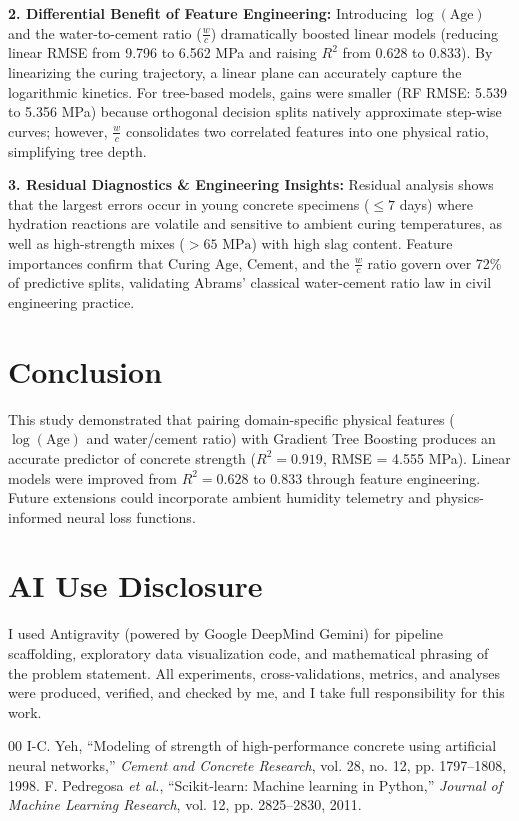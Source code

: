 \documentclass[conference]{IEEEtran}
\begin{document}
\textbf{2. Differential Benefit of Feature Engineering:} Introducing $\log(\text{Age})$ and the water-to-cement ratio ($\frac{w}{c}$) dramatically boosted linear models (reducing linear RMSE from 9.796 to 6.562 MPa and raising $R^2$ from 0.628 to 0.833). By linearizing the curing trajectory, a linear plane can accurately capture the logarithmic kinetics. For tree-based models, gains were smaller (RF RMSE: 5.539 to 5.356 MPa) because orthogonal decision splits natively approximate step-wise curves; however, $\frac{w}{c}$ consolidates two correlated features into one physical ratio, simplifying tree depth.

\textbf{3. Residual Diagnostics \& Engineering Insights:} Residual analysis shows that the largest errors occur in young concrete specimens ($\le 7$ days) where hydration reactions are volatile and sensitive to ambient curing temperatures, as well as high-strength mixes ($>65\text{ MPa}$) with high slag content. Feature importances confirm that Curing Age, Cement, and the $\frac{w}{c}$ ratio govern over 72\% of predictive splits, validating Abrams' classical water-cement ratio law in civil engineering practice.

\section{Conclusion}
This study demonstrated that pairing domain-specific physical features ($\log(\text{Age})$ and water/cement ratio) with Gradient Tree Boosting produces an accurate predictor of concrete strength ($R^2 = 0.919$, RMSE = 4.555 MPa). Linear models were improved from $R^2 = 0.628$ to $0.833$ through feature engineering. Future extensions could incorporate ambient humidity telemetry and physics-informed neural loss functions.

\section*{AI Use Disclosure}
I used Antigravity (powered by Google DeepMind Gemini) for pipeline scaffolding, exploratory data visualization code, and mathematical phrasing of the problem statement. All experiments, cross-validations, metrics, and analyses were produced, verified, and checked by me, and I take full responsibility for this work.

\begin{thebibliography}{00}
 I-C. Yeh, ``Modeling of strength of high-performance concrete using artificial neural networks,'' \emph{Cement and Concrete Research}, vol. 28, no. 12, pp. 1797--1808, 1998.
 F. Pedregosa \emph{et al.}, ``Scikit-learn: Machine learning in Python,'' \emph{Journal of Machine Learning Research}, vol. 12, pp. 2825--2830, 2011.
\end{thebibliography}
\end{document}
